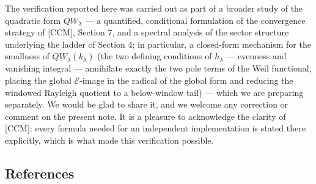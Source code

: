 \documentclass[
  letterpaper,
  11pt]{article}
\theoremstyle{plain}
\theoremstyle{definition}
\theoremstyle{remark}
\begin{document}
The verification reported here was carried out as part of a broader study of the quadratic form \(QW_\lambda\) --- a quantified, conditional formulation of the convergence strategy of {[}CCM{]}, Section 7, and a spectral analysis of the sector structure underlying the ladder of Section 4; in particular, a closed-form mechanism for the smallness of \(QW_\lambda(k_\lambda)\) (the two defining conditions of \(h_\lambda\) --- evenness and vanishing integral --- annihilate exactly the two pole terms of the Weil functional, placing the global \(\mathcal E\)-image in the radical of the global form and reducing the windowed Rayleigh quotient to a below-window tail) --- which we are preparing separately. We would be glad to share it, and we welcome any correction or comment on the present note. It is a pleasure to acknowledge the clarity of {[}CCM{]}: every formula needed for an independent implementation is stated there explicitly, which is what made this verification possible.

\subsection{References}\label{references}
\end{document}
